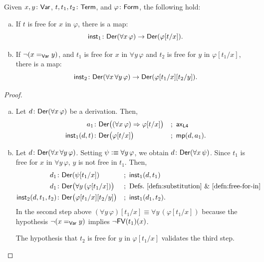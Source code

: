 \begin{lem}
    \label{lem:universal-instantiation}
    Given\/ $x,y\colon\fun{Var}$, $t,t_1,t_2\colon\fun{Term}$, and\/ $\varphi\colon\fun{Form}$, the following hold:
    \begin{enumerate}[a),font=\upshape]
        \item If\/ $t$ is free for\/ $x$ in\/ $\varphi$, there is a map:
        \[
            \fun{inst}_1\colon\fun{Der}(\forall x\,\varphi)\to\fun{Der}(\varphi[t/x]).
        \]
        
        \item If\/ $\neg(x\mathrel{=_{\mathsf{Var}}}y)$, and\/ $t_1$ is free for\/ $x$ in\/ $\forall y\,\varphi$ and\/ $t_2$ is free for\/ $y$ in\/ $\varphi[t_1/x]$, there is a map:
        \[
            \fun{inst}_2\colon\fun{Der}(
                \forall x\,\forall y\,\varphi
            )
            \to
            \fun{Der}(\varphi[t_1/x][t_2/y]).
        \]
    \end{enumerate}
\end{lem}

\begin{proof}\ 
    \begin{enumerate}[a)]
        \item Let $d\colon\fun{Der}(\forall x\,\varphi)$ be a derivation. Then,
        \begin{align*}
            a_1&\colon\fun{Der}\bigl(
                (\forall x\,\varphi)
                \imp
                \varphi[t/x]
            \bigr)
                &&;\ \fun{ax}_{\fun{L4}}\\
            \fun{inst}_1(d,t)&\colon\fun{Der}\bigl(
                \varphi[t/x]
            \bigr)
                &&;\ \fun{mp}(d,a_1).
        \end{align*}
        
        \item Let $d\colon\fun{Der}(\forall x\,\forall y\,\varphi)$. Setting $\psi\mathrel{\vcentcolon}\equiv\forall y\,\varphi$, we obtain $d\colon\fun{Der}(\forall x\,\psi)$. Since $t_1$ is free for $x$ in $\forall y\,\varphi$, $y$ is not free in $t_1$. Then,
        \begin{align*}
            d_1&\colon\fun{Der}(\psi[t_1/x])
                &&;\ \fun{inst}_1(d, t_1)\\
            d_1&\colon\fun{Der}\bigl(
                \forall y\,(\varphi[t_1/x])
            \bigr)
                &&;\ \text{Defs.~\ref{defn:substitution}
                    \& \ref{defn:free-for-in}}\\
            \fun{inst}_2(d,t_1,t_2)&\colon\fun{Der}\bigl(
                \varphi[t_1/x][t_2/y]
            \bigr)
                &&;\ \fun{inst}_1(d_1, t_2).
        \end{align*}
        In the second step above $(\forall y\,\varphi)[t_1/x]\equiv\forall y\,(\varphi[t_1/x])$ because the hypothesis $\neg(x\mathrel{=_{\mathsf{Var}}}y)$ implies $\neg\mathsf{FV}(t_1)(x)$.
        
        The hypothesis that $t_2$ is free for $y$ in $\varphi[t_1/x]$ validates the third step.
    \end{enumerate}

\end{proof}

